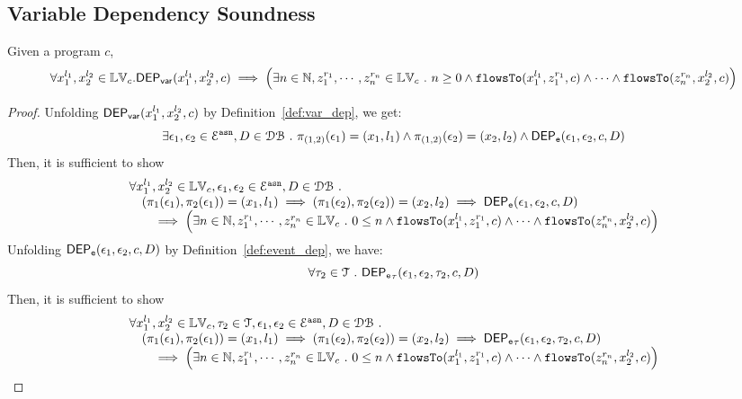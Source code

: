 
\clearpage
\subsection{Variable Dependency Soundness}
\begin{thm}
Given a program ${c}$, 
\[
  \forall {x}_1^{l_1}, {x}_2^{l_2} \in \mathbb{LV}_{{c}}.
  \mathsf{DEP_{var}}({x}_1^{l_1}, {x}_2^{l_2}, {c})
  \implies 
  \Big( \exists n \in \mathbb{N}, z_1^{r_1}, \cdots, z_n^{r_n} \in \mathbb{LV}_{{c}} ~.~ n \geq 0 \land
  \mathtt{flowsTo}(x_1^{l_1}, z_1^{r_1}, c) 
  \land \cdots \land \mathtt{flowsTo}(z_n^{r_n}, {x}_2^{l_2}, c) \Big)
\]
\end{thm}
\begin{proof}
Unfolding $\mathsf{DEP_{var}}({x}_1^{l_1}, {x}_2^{l_2}, {c})$ by Definition~\ref{def:var_dep},
we get:
\[
\exists \mathtt{\epsilon}_1, \mathtt{\epsilon}_2 \in \mathcal{E}^{\mathtt{{asn}}}, D \in \mathcal{DB} ~.~
\pi_{(1,2)}{(\mathtt{\epsilon}_1)} = ({x}_1, l_1)
\land
\pi_{(1,2)}{(\mathtt{\epsilon}_2)} = ({x}_2, l_2)
\land 
\mathsf{DEP_{\mathtt{e}}}(\mathtt{\epsilon}_1, \mathtt{\epsilon}_2, c, D)
\]
%
Then, it is sufficient to show
%
\[
\begin{array}{l}
\forall {x}_1^{l_1}, {x}_2^{l_2} \in \mathbb{LV}_{{c}},
 \mathtt{\epsilon}_1, \mathtt{\epsilon}_2 \in \mathcal{E}^{\mathtt{{asn}}}, D \in \mathcal{DB} ~.~
 \\ \quad
(\pi_{1}{(\mathtt{\epsilon}_1)}, \pi_{2}{(\mathtt{\epsilon}_1)}) = ({x}_1, l_1)
\implies
(\pi_{1}{(\mathtt{\epsilon}_2)}, \pi_{2}{(\mathtt{\epsilon}_2)}) = ({x}_2, l_2)
\implies 
\mathsf{DEP_{\mathtt{e}}}(\mathtt{\epsilon}_1, \mathtt{\epsilon}_2, c, D)
 \\ \qquad \implies
   \Big(\exists  n \in \mathbb{N},z_1^{r_1}, \cdots, z_n^{r_n} \in \mathbb{LV}_{{c}} ~.~ 0 \leq n
 \land \mathtt{flowsTo}(x_1^{l_1}, z_1^{r_1}, c) \land \cdots \land \mathtt{flowsTo}(z_n^{r_n}, {x}_2^{l_2}, c) \Big)
\end{array}
\]
%
Unfolding $\mathsf{DEP_{\mathtt{e}}}(\mathtt{\epsilon}_1, \mathtt{\epsilon}_2, c, D)$ by Definition~\ref{def:event_dep}, we have:
\[
  \forall \mathtt{\tau}_2 \in \mathcal{T} ~.~ \mathsf{DEP_{\mathtt{e}}}_{\mathtt{\tau}}(\mathtt{\epsilon}_1, \mathtt{\epsilon}_2, \mathtt{\tau}_2, c, D)
\]
%
Then, it is sufficient to show
%
\[
\begin{array}{l}
\forall {x}_1^{l_1}, {x}_2^{l_2} \in \mathbb{LV}_{{c}}, \mathtt{\tau}_2 \in \mathcal{T}, 
\mathtt{\epsilon}_1, \mathtt{\epsilon}_2 \in \mathcal{E}^{\mathtt{{asn}}}, D \in \mathcal{DB} ~.~
\\ \quad
(\pi_{1}{(\mathtt{\epsilon}_1)}, \pi_{2}{(\mathtt{\epsilon}_1)}) = ({x}_1, l_1)
\implies
(\pi_{1}{(\mathtt{\epsilon}_2)}, \pi_{2}{(\mathtt{\epsilon}_2)}) = ({x}_2, l_2)
\implies 
\mathsf{DEP_{\mathtt{e}}}_{\mathtt{\tau}}(\mathtt{\epsilon}_1, \mathtt{\epsilon}_2, \mathtt{\tau}_2, c, D)
 \\ \qquad \implies
   \Big(\exists  n \in \mathbb{N}, z_1^{r_1}, \cdots, z_n^{r_n} \in \mathbb{LV}_{{c}} ~.~ 0 \leq n
 \land \mathtt{flowsTo}(x_1^{l_1}, z_1^{r_1}, c) \land \cdots \land \mathtt{flowsTo}(z_n^{r_n}, {x}_2^{l_2}, c) \Big)

\end{array}\]
\end{proof}
